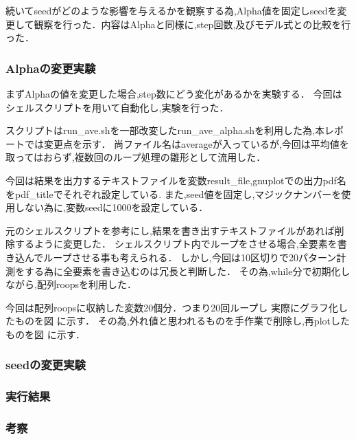 続いてseedがどのような影響を与えるかを観察する為,Alpha値を固定しseedを変更して観察を行った．内容はAlphaと同様に,step回数,及びモデル式との比較を行った．

\subsubsection{Alphaの変更実験}

まずAlphaの値を変更した場合,step数にどう変化があるかを実験する．
今回はシェルスクリプトを用いて自動化し,実験を行った．

スクリプトはrun\_ave.shを一部改変したrun\_ave\_alpha.shを利用した為,本レポートでは変更点を示す．
尚ファイル名はaverageが入っているが,今回は平均値を取ってはおらず,複数回のループ処理の雛形として流用した．



今回は結果を出力するテキストファイルを変数result\_file,gnuplotでの出力pdf名をpdf\_titleでそれぞれ設定している.
また,seed値を固定し,マジックナンバーを使用しない為に,変数seedに1000を設定している．

元のシェルスクリプトを参考にし,結果を書き出すテキストファイルがあれば削除するように変更した．
シェルスクリプト内でループをさせる場合,全要素を書き込んでループさせる事も考えられる．
しかし,今回は10区切りで20パターン計測をする為に全要素を書き込むのは冗長と判断した．
その為,while分で初期化しながら,配列roops\cite{shellq}を利用した．

今回は配列roopsに収納した変数20個分．つまり20回ループし
実際にグラフ化したものを図 に示す．
その為,外れ値と思われるものを手作業で削除し,再plotしたものを図 に示す．

\subsubsection{seedの変更実験}

\subsubsection{実行結果}
\subsubsection{考察}

